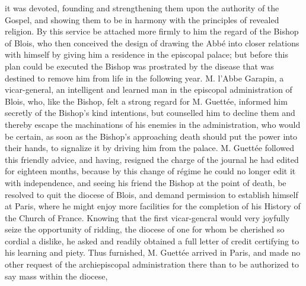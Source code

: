 it was devoted, founding and strengthening them upon the authority of the Gospel, and showing them to be in harmony with the principles of revealed religion. By this service be attached more firmly to him the regard of the Bishop of Blois, who then conceived the design of drawing the Abbé into closer relations with himself by giving him a residence in the episcopal palace; but before this plan could be executed the Bishop was prostrated by the disease that was destined to remove him from life in the following year. M. l'Abbe Garapin, a vicar-general, an intelligent and learned man in the episcopal administration of Blois, who, like the Bishop, felt a strong regard for M. Guettée, informed him secretly of the Bishop's kind intentions, but counselled him to decline them and thereby escape the machinations of his enemies in the administration, who would be certain, as soon as the Bishop's approaching death should put the power into their hands, to signalize it by driving him from the palace. M. Guettée followed this friendly advice, and having, resigned the charge of the journal he had edited for eighteen months, because by this change of régime he could no longer edit it with independence, and seeing his friend the Bishop at the point of death, be resolved to quit the diocese of Blois, and demand permission to establish himself at Paris, where he might enjoy more facilities for the completion of his History of the Church of France. Knowing that the first vicar-gencral would very joyfully seize the opportunity of ridding, the diocese of one for whom be cherished so cordial a dislike, he asked and readily obtained a full letter of credit certifying to his learning and piety. Thus furnished, M. Guettée arrived in Paris, and made no other request of the archiepiscopal administration there than to be authorized to say mass within the diocese,

